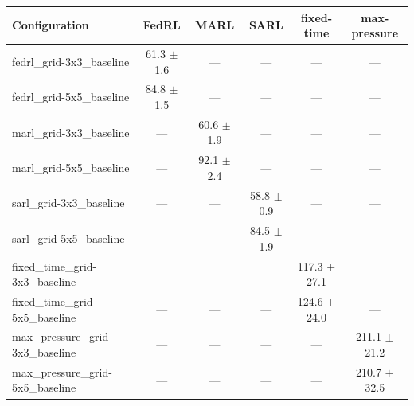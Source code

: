 \begin{tabular}{lccccc}
\toprule
Configuration & FedRL & MARL & SARL & fixed-time & max-pressure \\
\midrule
fedrl_grid-3x3_baseline & 61.3 $\pm$ 1.6 & --- & --- & --- & --- \\
fedrl_grid-5x5_baseline & 84.8 $\pm$ 1.5 & --- & --- & --- & --- \\
marl_grid-3x3_baseline & --- & 60.6 $\pm$ 1.9 & --- & --- & --- \\
marl_grid-5x5_baseline & --- & 92.1 $\pm$ 2.4 & --- & --- & --- \\
sarl_grid-3x3_baseline & --- & --- & 58.8 $\pm$ 0.9 & --- & --- \\
sarl_grid-5x5_baseline & --- & --- & 84.5 $\pm$ 1.9 & --- & --- \\
fixed_time_grid-3x3_baseline & --- & --- & --- & 117.3 $\pm$ 27.1 & --- \\
fixed_time_grid-5x5_baseline & --- & --- & --- & 124.6 $\pm$ 24.0 & --- \\
max_pressure_grid-3x3_baseline & --- & --- & --- & --- & 211.1 $\pm$ 21.2 \\
max_pressure_grid-5x5_baseline & --- & --- & --- & --- & 210.7 $\pm$ 32.5 \\
\bottomrule
\end{tabular}
